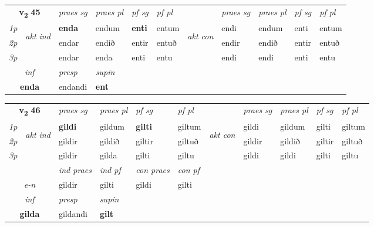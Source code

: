 \noindent
\begin{tabular}{lllllllllll} \toprule
\multicolumn{2}{c}{\textbf{v{\textsubscript{2}}} \Large{\textbf{45}}}  &  \textit{praes sg}  & \textit{praes pl}  &\textit{ pf sg} & \textit{pf pl} &  &  \textit{praes sg}  & \textit{praes pl}  & \textit{pf sg} & \textit{pf pl } \\*
	\cmidrule{3-6} \cmidrule{8-11}
 {\textit{1p}} & \multirow{3}{*}{\begin{turn}{90}\textit{akt ind}\end{turn}} & \textbf{enda} & endum & \textbf{enti} & entum & \multirow{3}{*}{\begin{turn}{90}\textit{akt con}\end{turn}} &endi & endum & enti & entum\\*
 {\textit{2p}} &  &  endar  & endið & entir & entuð & & endir & endið & entir & entuð \\*
{\textit{3p}} &  & endar & enda & enti & entu & & endi & endi& enti & entu \\*
\cmidrule{3-6} \cmidrule{8-11}

   \multicolumn{2}{c}{\textit{inf}}     & \textit{presp} & \textit{supin}   \\*
  \multicolumn{2}{c}{\textbf{enda}}      & endandi &  \textbf{ent}   \\*
\end{tabular}

\noindent
\begin{tabular}{lllllllllll} \toprule
\multicolumn{2}{c}{\textbf{v{\textsubscript{2}}} \Large{\textbf{46}}}  &  \textit{praes sg}  & \textit{praes pl}  &\textit{ pf sg} & \textit{pf pl} &  &  \textit{praes sg}  & \textit{praes pl}  & \textit{pf sg} & \textit{pf pl } \\*
	\cmidrule{3-6} \cmidrule{8-11}
 {\textit{1p}} & \multirow{3}{*}{\begin{turn}{90}\textit{akt ind}\end{turn}} & \textbf{gildi} & gildum & \textbf{gilti} & giltum & \multirow{3}{*}{\begin{turn}{90}\textit{akt con}\end{turn}} &gildi & gildum & gilti & giltum\\*
 {\textit{2p}} &  &  gildir  & gildið & giltir & giltuð & & gildir & gildið & giltir & giltuð \\*
{\textit{3p}} &  & gildir & gilda & gilti & giltu & & gildi & gildi& gilti & giltu \\*
\cmidrule{3-6} \cmidrule{8-11}

   & &  \textit{ind praes} & \textit{ind pf} & \textit{con praes} & \textit{con pf} \\*
\multicolumn{2}{c}{ \textit{e-n} } & gildir & gilti & gildi & gilti \\*

\cmidrule{3-4}
   \multicolumn{2}{c}{\textit{inf}}     & \textit{presp} & \textit{supin}   \\*
  \multicolumn{2}{c}{\textbf{gilda}}      & gildandi &  \textbf{gilt}   \\*
\end{tabular}

